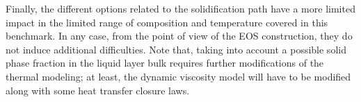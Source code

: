Finally, the different options related to the solidification path have a more limited impact in the limited range of composition and temperature covered in this benchmark. In any case, from the point of view of the EOS construction, they do not induce additional difficulties. Note that, taking into account a possible solid phase fraction in the liquid layer bulk requires further modifications of the thermal modeling; at least, the dynamic viscosity model will have to be modified along with some heat transfer closure laws.



